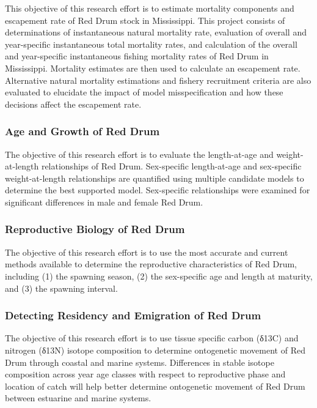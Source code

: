\documentclass[]{article}
\begin{document}
This objective of this research effort is to estimate mortality
components and escapement rate of Red Drum stock in Mississippi. This
project consists of determinations of instantaneous natural mortality
rate, evaluation of overall and year-specific instantaneous total
mortality rates, and calculation of the overall and year-specific
instantaneous fishing mortality rates of Red Drum in Mississippi.
Mortality estimates are then used to calculate an escapement rate.
Alternative natural mortality estimations and fishery recruitment
criteria are also evaluated to elucidate the impact of model
misspecification and how these decisions affect the escapement rate.

\hypertarget{age-and-growth-of-red-drum}{%
\subsubsection{Age and Growth of Red
Drum}\label{age-and-growth-of-red-drum}}

The objective of this research effort is to evaluate the length-at-age
and weight-at-length relationships of Red Drum. Sex-specific
length-at-age and sex-specific weight-at-length relationships are
quantified using multiple candidate models to determine the best
supported model. Sex-specific relationships were examined for
significant differences in male and female Red Drum.

\hypertarget{reproductive-biology-of-red-drum}{%
\subsubsection{Reproductive Biology of Red
Drum}\label{reproductive-biology-of-red-drum}}

The objective of this research effort is to use the most accurate and
current methods available to determine the reproductive characteristics
of Red Drum, including (1) the spawning season, (2) the sex-specific age
and length at maturity, and (3) the spawning interval.

\hypertarget{detecting-residency-and-emigration-of-red-drum}{%
\subsubsection{Detecting Residency and Emigration of Red
Drum}\label{detecting-residency-and-emigration-of-red-drum}}

The objective of this research effort is to use tissue specific carbon
(δ13C) and nitrogen (δ13N) isotope composition to determine ontogenetic
movement of Red Drum through coastal and marine systems. Differences in
stable isotope composition across year age classes with respect to
reproductive phase and location of catch will help better determine
ontogenetic movement of Red Drum between estuarine and marine systems.
\end{document}
